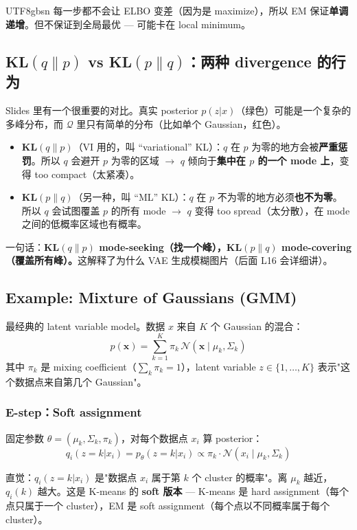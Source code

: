 \documentclass[11pt]{article}
\begin{document}
\begin{CJK}{UTF8}{gbsn}
每一步都不会让 ELBO 变差（因为是 maximize），所以 EM 保证\textbf{单调递增}。但不保证到全局最优 --- 可能卡在 local minimum。

\subsection{KL$(q\|p)$ vs KL$(p\|q)$：两种 divergence 的行为}

Slides 里有一个很重要的对比。真实 posterior $p(z|x)$（绿色）可能是一个复杂的多峰分布，而 $\mathcal{Q}$ 里只有简单的分布（比如单个 Gaussian，红色）。

\begin{itemize}
  \item \textbf{KL$(q\|p)$}（VI 用的，叫 ``variational'' KL）：$q$ 在 $p$ 为零的地方会被\textbf{严重惩罚}。所以 $q$ 会避开 $p$ 为零的区域 $\to$ $q$ 倾向于\textbf{集中在 $p$ 的一个 mode 上}，变得 too compact（太紧凑）。
  \item \textbf{KL$(p\|q)$}（另一种，叫 ``ML'' KL）：$q$ 在 $p$ 不为零的地方必须\textbf{也不为零}。所以 $q$ 会试图覆盖 $p$ 的所有 mode $\to$ $q$ 变得 too spread（太分散），在 mode 之间的低概率区域也有概率。
\end{itemize}

一句话：\textbf{KL$(q\|p)$ mode-seeking（找一个峰），KL$(p\|q)$ mode-covering（覆盖所有峰）。}这解释了为什么 VAE 生成模糊图片（后面 L16 会详细讲）。

\subsection{Example: Mixture of Gaussians (GMM)}

最经典的 latent variable model。数据 $x$ 来自 $K$ 个 Gaussian 的混合：
\[
  p(\mathbf{x}) = \sum_{k=1}^{K} \pi_k \,\mathcal{N}(\mathbf{x} \mid \mu_k, \Sigma_k)
\]
其中 $\pi_k$ 是 mixing coefficient（$\sum_k \pi_k = 1$），latent variable $z \in \{1, \dots, K\}$ 表示"这个数据点来自第几个 Gaussian"。

\subsubsection{E-step：Soft assignment}

固定参数 $\theta = (\mu_k, \Sigma_k, \pi_k)$，对每个数据点 $x_i$ 算 posterior：
\[
  q_i(z = k | x_i) = p_\theta(z = k | x_i) \propto \pi_k \cdot \mathcal{N}(x_i \mid \mu_k, \Sigma_k)
\]

直觉：$q_i(z = k | x_i)$ 是"数据点 $x_i$ 属于第 $k$ 个 cluster 的概率"。离 $\mu_k$ 越近，$q_i(k)$ 越大。这是 K-means 的 \textbf{soft 版本} --- K-means 是 hard assignment（每个点只属于一个 cluster），EM 是 soft assignment（每个点以不同概率属于每个 cluster）。


\end{CJK}
\end{document}
